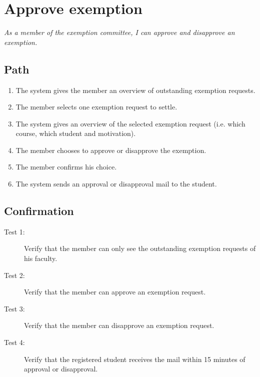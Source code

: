 \section{Approve exemption}

\par \emph{As a member of the exemption committee, I can approve and disapprove an exemption.}

\subsection{Path}

\begin{enumerate}
  \item The system gives the member an overview of outstanding exemption
  requests.
  \item The member selects one exemption request to settle.
  \item The system gives an overview of the selected exemption request (i.e.
  which course, which student and motivation).
  \item The member chooses to approve or disapprove the exemption.
  \item The member confirms his choice.
  \item The system sends an approval or disapproval mail to the student.
\end{enumerate}

\subsection{Confirmation}

\begin{description}
\item[Test 1:] Verify that the member can only see the outstanding exemption
requests of his faculty.
\item[Test 2:] Verify that the member can approve an exemption request.
\item[Test 3:] Verify that the member can disapprove an exemption request.
\item[Test 4:] Verify that the registered student receives the mail within 15
minutes of approval or disapproval.
\end{description}
